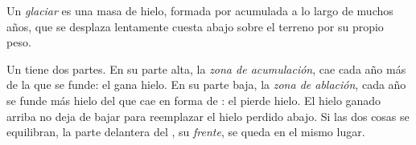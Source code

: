 \begin{definition}[Glaciar]\label{def:g8:ice-on-earth:glacier}
Un \emph{glaciar} es una masa de hielo, formada por 
acumulada a lo largo de muchos años, que se desplaza lentamente cuesta
abajo sobre el terreno por su propio peso.
\end{definition}

Un  tiene dos partes. En su parte alta, la \emph{zona de
acumulación}, cae cada año más  de la que se funde: el  gana
hielo. En su parte baja, la \emph{zona de ablación}, cada año se funde más
hielo del que cae en forma de : el  pierde hielo. El hielo
ganado arriba no deja de bajar para reemplazar el hielo perdido abajo. Si
las dos cosas se equilibran, la parte delantera del , su
\emph{frente}, se queda en el mismo lugar.

